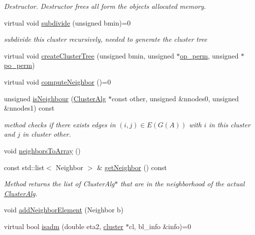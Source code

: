 \begin{DoxyCompactItemize}
\begin{DoxyCompactList}\small\item\em \-Destructor. \-Destructor frees all form the objects allocated memory. \end{DoxyCompactList}\item 
virtual void \hyperlink{classClusterAlg_ab2615e5ba68257b11d477274737a9c52}{subdivide} (unsigned bmin)=0
\begin{DoxyCompactList}\small\item\em subdivide this cluster recursively, needed to generate the cluster tree \end{DoxyCompactList}\item 
virtual void \hyperlink{classClusterAlg_acbbefef10e2d91713a567af5bb5c08f7}{create\-Cluster\-Tree} (unsigned bmin, unsigned $\ast$\hyperlink{classClusterAlg_a4f06e1465978072d8c6bd098e062b701}{op\-\_\-perm}, unsigned $\ast$\hyperlink{classClusterAlg_af3d1d7c4ae0516ff9de725d3ff760b07}{po\-\_\-perm})
\item 
virtual void \hyperlink{classClusterAlg_a3da066d722da219e5f64f624a6121b05}{compute\-Neighbor} ()=0
\item 
unsigned \hyperlink{classClusterAlg_adce4fbafed2d9226336d3b57fae89692}{is\-Neighbour} (\hyperlink{classClusterAlg}{\-Cluster\-Alg} $\ast$const other, unsigned \&nnodes0, unsigned \&nnodes1) const 
\begin{DoxyCompactList}\small\item\em method checks if there exists edges in $(i, j) \in E(G(A))$ with $i$ in this cluster and $j$ in cluster other. \end{DoxyCompactList}\item 
void \hyperlink{classClusterAlg_ac7175d7df8045c8ad4363f709b5cc6cd}{neighbors\-To\-Array} ()
\item 
const std\-::list$<$ \-Neighbor $>$ \& \hyperlink{classClusterAlg_a468cf8819a9bae6a6b65db3ad6fb2d2d}{get\-Neighbor} () const 
\begin{DoxyCompactList}\small\item\em \-Method returns the list of \-Cluster\-Alg$\ast$ that are in the neighborhood of the actual \hyperlink{classClusterAlg}{\-Cluster\-Alg}. \end{DoxyCompactList}\item 
void \hyperlink{classClusterAlg_a3ce04d40392ab7e8143de5ffcaea6dda}{add\-Neighbor\-Element} (\-Neighbor b)
\item 
\hypertarget{classClusterAlg_a3daa14e294fe03b1405d057de3a640be}{
virtual bool \hyperlink{classClusterAlg_a3daa14e294fe03b1405d057de3a640be}{isadm} (double eta2, \hyperlink{classcluster}{cluster} $\ast$cl, bl\-\_\-info \&info)=0}
\label{classClusterAlg_a3daa14e294fe03b1405d057de3a640be}


\end{DoxyCompactItemize}
